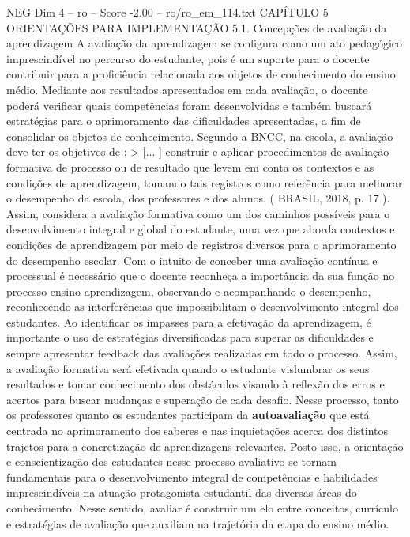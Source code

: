\begin{textsample}{NEG Dim 4 – ro – Score -2.00 – ro/ro\_em\_114.txt}  \label{ex:f4_neg_077}
CAPÍTULO 5 ORIENTAÇÕES PARA IMPLEMENTAÇÃO 5.1.
Concepções de avaliação da aprendizagem A avaliação da aprendizagem se configura como um ato pedagógico imprescindível no percurso do estudante, pois é um suporte para o docente contribuir para a proficiência relacionada aos objetos de conhecimento do ensino médio.
Mediante aos resultados apresentados em cada avaliação, o docente poderá verificar quais competências foram desenvolvidas e também buscará estratégias para o aprimoramento das dificuldades apresentadas, a fim de consolidar os objetos de conhecimento.
Segundo a BNCC, na escola, a avaliação deve ter os objetivos de : > [... ] construir e aplicar procedimentos de avaliação formativa de processo ou de resultado que levem em conta os contextos e as condições de aprendizagem, tomando tais registros como referência para melhorar o desempenho da escola, dos professores e dos alunos. ( BRASIL, 2018, p. 17 ).
Assim, considera a avaliação formativa como um dos caminhos possíveis para o desenvolvimento integral e global do estudante, uma vez que aborda contextos e condições de aprendizagem por meio de registros diversos para o aprimoramento do desempenho escolar.
Com o intuito de conceber uma avaliação contínua e processual é necessário que o docente reconheça a importância da sua função no processo ensino-aprendizagem, observando e acompanhando o desempenho, reconhecendo as interferências que impossibilitam o desenvolvimento integral dos estudantes.
Ao identificar os impasses para a efetivação da aprendizagem, é importante o uso de estratégias diversificadas para superar as dificuldades e sempre apresentar feedback das avaliações realizadas em todo o processo.
Assim, a avaliação formativa será efetivada quando o estudante vislumbrar os seus resultados e tomar conhecimento dos obstáculos visando à reflexão dos erros e acertos para buscar mudanças e superação de cada desafio.
Nesse processo, tanto os professores quanto os estudantes participam da \textbf{autoavaliação} que está centrada no aprimoramento dos saberes e nas inquietações acerca dos distintos trajetos para a concretização de aprendizagens relevantes.
Posto isso, a orientação e conscientização dos estudantes nesse processo avaliativo se tornam fundamentais para o desenvolvimento integral de competências e habilidades imprescindíveis na atuação protagonista estudantil das diversas áreas do conhecimento.
Nesse sentido, avaliar é construir um elo entre conceitos, currículo e estratégias de avaliação que auxiliam na trajetória da etapa do ensino médio.

\end{textsample}
